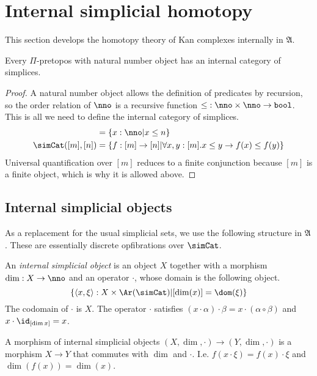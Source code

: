 \documentclass{tac}
\newcommand\hide[1]{}
\newcommand\set[1]{\left\{#1\right\}}
\newcommand\of{:}
\newcommand\tuplet[1]{\left\langle #1 \right\rangle}
\newcommand\bool{\mathtt{bool}}
\newcommand\ambient{\mathfrak A}
\begin{document}
\section{Internal simplicial homotopy}
This section develops the homotopy theory of Kan complexes internally in $\ambient$.

\begin{proposition} Every $\Pi$-pretopos with natural number object has an internal category of simplices.\end{proposition}

\begin{proof} A natural number object allows the definition of predicates by recursion, so the order relation of $\nno$ is a recursive function $\mathord\leq\of\nno\times \nno \to \bool$. This is all we need to define the internal category of simplices.
\begin{align*}
[n] &= \set{x\of\nno\middle| x\leq n}\\
\simCat([m],[n]) &= \set{f\of[m]\to[n]\middle|\forall x,y\of [m].x\leq y\to f(x)\leq f(y)}
\end{align*}
Universal quantification over $[m]$ reduces to a finite conjunction because $[m]$ is a finite object, which is why it is allowed above. 
\end{proof}

\subsection{Internal simplicial objects}%
As a replacement for the usual simplicial sets, we use the following structure in $\ambient$. These are essentially discrete opfibrations over $\simCat$.

\begin{definition} An \emph{internal simplicial object} is an object $X$ together with a morphism $\dim\of X\to\nno$ and an operator $\cdot$, whose domain is the following object.
\[ \set{\tuplet{x,\xi}\of X\times\Ar(\simCat)| [\dim (x)]=\dom(\xi)} \]
The codomain of $\cdot$ is $X$. The operator $\cdot$ satisfies $(x\cdot\alpha)\cdot\beta=x\cdot(\alpha\circ\beta)$ and $x\cdot\id_{[\dim x]}=x$.  

A morphism of internal simplicial objects $(X,\dim,\cdot)\to (Y,\dim,\cdot)$ is a morphism $X\to Y$ that commutes with $\dim$ and $\cdot$. I.e. $f(x\cdot \xi)=f(x)\cdot\xi$ and $\dim(f(x))=\dim(x)$.
\end{definition}\hide{ Is it feasible to rewrite the whole paper with these?}
\end{document}
